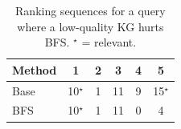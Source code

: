 
\begin{table}[t]
\centering
\footnotesize
\setlength{\tabcolsep}{3pt}
\begin{tabular}{lccccc}
\toprule
Method & 1 & 2 & 3 & 4 & 5 \\
\midrule
Base & 10$^\star$ & 1 & 11 & 9 & 15$^\star$ \\
BFS & 10$^\star$ & 1 & 11 & 0 & 4 \\
\bottomrule
\end{tabular}
\caption{Ranking sequences for a query where a low-quality KG hurts BFS. $^\star$ = relevant.}
\label{tab:bad_example}
\end{table}


